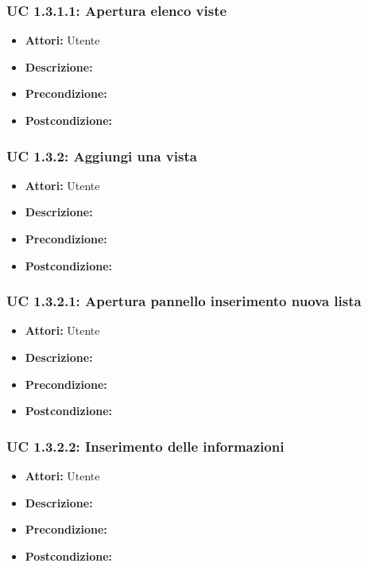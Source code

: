 \subsubsection{UC 1.3.1.1: Apertura elenco viste}

\begin{itemize}
\item \textbf{Attori:} Utente
\item \textbf{Descrizione:} 
\item \textbf{Precondizione:} 
\item \textbf{Postcondizione:} 
\end{itemize}

\subsubsection{UC 1.3.2: Aggiungi una vista}

\begin{itemize}
\item \textbf{Attori:} Utente
\item \textbf{Descrizione:} 
\item \textbf{Precondizione:} 
\item \textbf{Postcondizione:} 
\end{itemize}

\subsubsection{UC 1.3.2.1: Apertura pannello inserimento nuova lista}

\begin{itemize}
\item \textbf{Attori:} Utente
\item \textbf{Descrizione:} 
\item \textbf{Precondizione:} 
\item \textbf{Postcondizione:} 
\end{itemize}

\subsubsection{UC 1.3.2.2: Inserimento delle informazioni}

\begin{itemize}
\item \textbf{Attori:} Utente
\item \textbf{Descrizione:} 
\item \textbf{Precondizione:} 
\item \textbf{Postcondizione:} 
\end{itemize}

